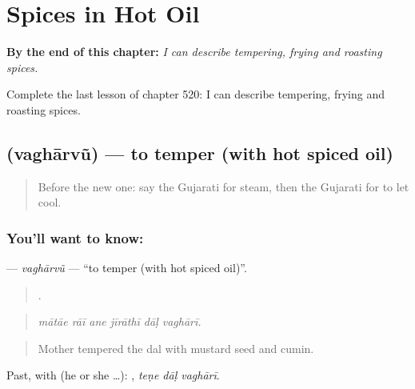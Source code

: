 
\chapter{Spices in Hot Oil}
\label{ch:gu-spices-in-hot-oil}

\begin{chapteropening}
\textbf{By the end of this chapter:} \emph{I can describe tempering, frying and roasting spices.}

Complete the last lesson of chapter 520: I can describe tempering, frying and roasting spices.
\end{chapteropening}

\section[\texorpdfstring{\gu{વઘારવું} (vaghārvũ)}{વઘારવું (vaghārvũ)}]{ (vaghārvũ) — to temper (with hot spiced oil)}

\label{lesson:GU-C520-vagharvu}



\begin{quote}
Before the new one: say the Gujarati for steam, then the Gujarati for to let cool.
\end{quote}

\subsection*{You'll want to know: }
\textbf{} — \emph{vaghārvũ} — \textquotedblleft{}to temper (with hot spiced oil)\textquotedblright{}.

\begin{quote}
     .
\end{quote}

\begin{quote}
\emph{mātāe rāī ane jīrāthī dāḷ vaghārī.}
\end{quote}

\begin{quote}
Mother tempered the dal with mustard seed and cumin.
\end{quote}

Past, with  (he or she …):   , \emph{teṇe dāḷ vaghārī}.

